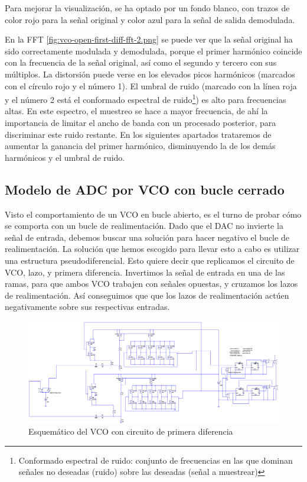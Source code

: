 \documentclass[12pt]{report} %
\begin{document}
	Para mejorar la visualización, se ha optado por un fondo blanco, con trazos de color rojo para la señal original y color azul para la señal de salida demodulada.
	
	En la FFT \ref{fig:vco-open-first-diff-fft-2.png} se puede ver que la señal original ha sido correctamente modulada y demodulada, porque el primer harmónico coincide con la frecuencia de la señal original, así como el segundo y tercero con sus múltiplos. La distorsión puede verse en los elevados picos harmónicos (marcados con el círculo rojo y el número 1). El umbral de ruido (marcado con la línea roja y el número 2 está el conformado espectral de ruido\footnote{Conformado espectral de ruido: conjunto de frecuencias en las que dominan señales no deseadas (ruido) sobre las deseadas (señal a muestrear)}) es alto para frecuencias altas. En este espectro, el muestreo se hace a mayor frecuencia, de ahí la importancia de limitar el ancho de banda con un procesado posterior, para discriminar este ruido restante. En los siguientes apartados trataremos de aumentar la ganancia del primer harmónico, disminuyendo la de los demás harmónicos y el umbral de ruido.
	
	\subsection{Modelo de ADC por VCO con bucle cerrado}\label{ss:vco-open}
	
	Visto el comportamiento de un VCO en bucle abierto, es el turno de probar cómo se comporta con un bucle de realimentación. Dado que el DAC no invierte la señal de entrada, debemos buscar una solución para hacer negativo el bucle de realimentación. La solución que hemos escogido para llevar esto a cabo es utilizar una estructura pseudodiferencial. Esto quiere decir que replicamos el circuito de VCO, lazo, y primera diferencia. Invertimos la señal de entrada en una de las ramas, para que ambos VCO trabajen con señales opuestas, y cruzamos los lazos de realimentación. Así conseguimos que que los lazos de realimentación actúen negativamente sobre sus respectivas entradas.
	
	\begin{figure}[H]
		\includegraphics[width=\textwidth]{ltspice-vco-closed-diff.png}
		\caption[Esquemático del VCO con circuito de primera diferencia]{Esquemático del VCO con circuito de primera diferencia}
		\label{fig:ltspice-vco-closed-diff.png}
	\end{figure}
\end{document}
